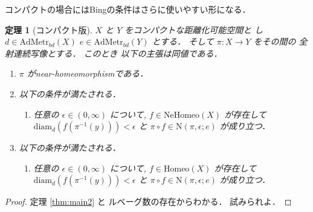 \documentclass[leqno, a4paper, 12pt]{jsarticle}
\numberwithin{equation}{section}
\newtheorem{thm}{定理}
\newcommand{\yonbsetq}[3]{\mathrm{N}(#1, #2; #3)}
\newcommand{\yocbamet}[1]{\mathrm{AdMetr}_{bd}(#1)}
\newcommand{\yodiam}{\mathrm{diam}}
\newcommand{\yomapnhset}[1]{\mathrm{NeHomeo}(#1)}
\newcommand{\yomaphset}[1]{\mathrm{Homeo}(#1)}
\begin{document}
コンパクトの場合にはBingの条件はさらに使いやすい形になる．
\begin{thm}[コンパクト版]\label{thm:main4}
$X$
と
$Y$
をコンパクトな距離化可能空間と
し
$d\in \yocbamet{X}$
$e\in \yocbamet{Y}$
とする．
そして
$\pi \colon X\to Y$
をその間の
全射連続写像とする．
このとき
以下の主張は同値である．

\begin{enumerate}[label=\textup{(\arabic*)}]
\item\label{item:thmk:1}
$\pi$
がnear-homeomorphismである．

\item\label{item:thmk:2}
以下の条件が満たされる．
\begin{enumerate}[label=\textup{(Bing-K)}, leftmargin=*]
\item\label{item:bingconditionk}
任意の
$\epsilon\in (0, \infty)$
について, 
$f\in \yomapnhset{X}$
が存在して
$\yodiam_{d}(f(\pi^{-1}(y)))<\epsilon$
と
$\pi\circ f\in \yonbsetq{\pi}{\epsilon}{e}$
が成り立つ．
\end{enumerate}

\item\label{item:thmk:3}

以下の条件が満たされる．
\begin{enumerate}[label=\textup{(Bing-$*$K)}, leftmargin=*]
\item\label{item:bingconditionkstar}
任意の
$\epsilon\in (0, \infty)$
について, 
$f\in \yomaphset{X}$
が存在して
$\yodiam_{d}(f(\pi^{-1}(y)))<\epsilon$
と
$\pi\circ f\in \yonbsetq{\pi}{\epsilon}{e}$
が成り立つ．
\end{enumerate}


\end{enumerate}
\end{thm}
\begin{proof}
定理
\ref{thm:main2}
と
ルベーグ数の存在からわかる．
試みられよ．
\end{proof}
\end{document}
